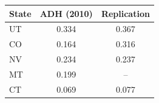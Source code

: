 \begin{tabular}{lcc}
\toprule
State & ADH (2010) & Replication \\
\midrule
UT & 0.334 & 0.367 \\
CO & 0.164 & 0.316 \\
NV & 0.234 & 0.237 \\
MT & 0.199 & -- \\
CT & 0.069 & 0.077 \\
\bottomrule
\end{tabular}
